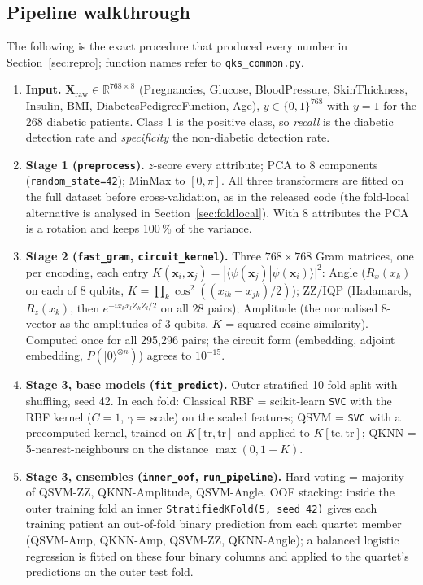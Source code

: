 \documentclass[11pt,a4paper]{article}
\newcommand{\code}[1]{\texttt{\small #1}}
\begin{document}
\subsection{Pipeline walkthrough}
\label{sec:walkthrough}
The following is the exact procedure that produced every number in Section~\ref{sec:repro}; function names refer to \code{qks\_common.py}.
\begin{enumerate}[nosep]
  \item \textbf{Input.} $\mathbf{X}_{\mathrm{raw}}\in\mathbb{R}^{768\times 8}$ (Pregnancies, Glucose, BloodPressure, SkinThickness, Insulin, BMI, DiabetesPedigreeFunction, Age), $y\in\{0,1\}^{768}$ with $y=1$ for the 268 diabetic patients. Class 1 is the positive class, so \emph{recall} is the diabetic detection rate and \emph{specificity} the non-diabetic detection rate.
  \item \textbf{Stage 1 (\code{preprocess}).} $z$-score every attribute; PCA to 8 components (\code{random\_state=42}); MinMax to $[0,\pi]$. All three transformers are fitted on the full dataset before cross-validation, as in the released code (the fold-local alternative is analysed in Section~\ref{sec:foldlocal}). With 8 attributes the PCA is a rotation and keeps 100\,\% of the variance.
  \item \textbf{Stage 2 (\code{fast\_gram}, \code{circuit\_kernel}).} Three $768\times768$ Gram matrices, one per encoding, each entry $K(\mathbf{x}_i,\mathbf{x}_j)=|\langle\psi(\mathbf{x}_j)|\psi(\mathbf{x}_i)\rangle|^2$: Angle ($R_x(x_k)$ on each of 8 qubits, $K=\prod_k\cos^2((x_{ik}-x_{jk})/2)$); ZZ/IQP (Hadamards, $R_z(x_k)$, then $e^{-i x_k x_l Z_kZ_l/2}$ on all 28 pairs); Amplitude (the normalised 8-vector as the amplitudes of 3 qubits, $K$ = squared cosine similarity). Computed once for all 295,296 pairs; the circuit form (embedding, adjoint embedding, $P(|0\rangle^{\otimes n})$) agrees to $10^{-15}$.
  \item \textbf{Stage 3, base models (\code{fit\_predict}).} Outer stratified 10-fold split with shuffling, seed 42. In each fold: Classical RBF = scikit-learn \code{SVC} with the RBF kernel ($C=1$, $\gamma=$\,scale) on the scaled features; QSVM = \code{SVC} with a precomputed kernel, trained on $K[\mathrm{tr},\mathrm{tr}]$ and applied to $K[\mathrm{te},\mathrm{tr}]$; QKNN = 5-nearest-neighbours on the distance $\max(0,1-K)$.
  \item \textbf{Stage 3, ensembles (\code{inner\_oof}, \code{run\_pipeline}).} Hard voting = majority of QSVM-ZZ, QKNN-Amplitude, QSVM-Angle. OOF stacking: inside the outer training fold an inner \code{StratifiedKFold(5, seed 42)} gives each training patient an out-of-fold binary prediction from each quartet member (QSVM-Amp, QKNN-Amp, QSVM-ZZ, QKNN-Angle); a balanced logistic regression is fitted on these four binary columns and applied to the quartet's predictions on the outer test fold.

\end{enumerate}
\end{document}
